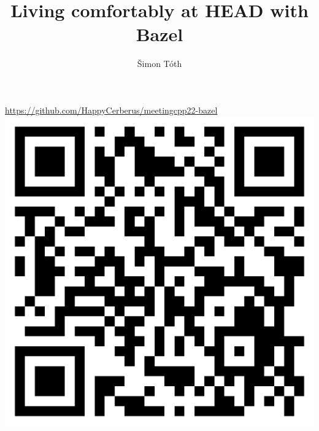 \documentclass[aspectratio=169]{beamer}
\title{Living comfortably at HEAD with Bazel}
\author{Šimon Tóth}
\begin{document}
\begin{frame}{}
    \titlepage
\end{frame}

\begin{frame}{}
\begin{center}
        \Large\href{https://github.com/HappyCerberus/meetingcpp22-bazel}{https://github.com/HappyCerberus/meetingcpp22-bazel}\\
        \includegraphics[width=.4\textwidth]{static/qrcode.png}
\end{center}
\end{frame}
\end{document}
